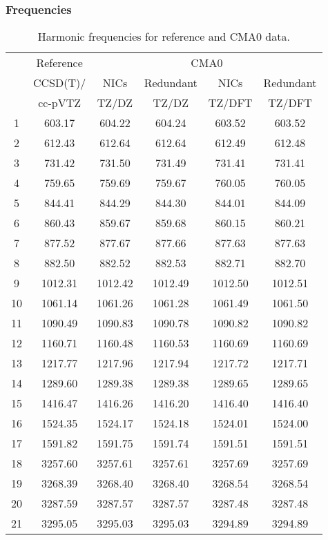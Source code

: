 \documentclass[10pt,oneside]{article}
\begin{document}
\begin{table}[h!]
\subsubsection*{Frequencies}
\centering
\caption{Harmonic frequencies for reference and CMA0 data.}
\begin{tabular}{cccccc}
\toprule
{} & Reference & \multicolumn{4}{c}{CMA0} \\
{} &  CCSD(T)/ &    NICs &  Redundant &    NICs & Redundant \\
{} &   cc-pVTZ &   TZ/DZ &      TZ/DZ &  TZ/DFT &    TZ/DFT \\
\midrule
1  &    603.17 &  604.22 &     604.24 &  603.52 &    603.52 \\
2  &    612.43 &  612.64 &     612.64 &  612.49 &    612.48 \\
3  &    731.42 &  731.50 &     731.49 &  731.41 &    731.41 \\
4  &    759.65 &  759.69 &     759.67 &  760.05 &    760.05 \\
5  &    844.41 &  844.29 &     844.30 &  844.01 &    844.09 \\
6  &    860.43 &  859.67 &     859.68 &  860.15 &    860.21 \\
7  &    877.52 &  877.67 &     877.66 &  877.63 &    877.63 \\
8  &    882.50 &  882.52 &     882.53 &  882.71 &    882.70 \\
9  &   1012.31 & 1012.42 &    1012.49 & 1012.50 &   1012.51 \\
10 &   1061.14 & 1061.26 &    1061.28 & 1061.49 &   1061.50 \\
11 &   1090.49 & 1090.83 &    1090.78 & 1090.82 &   1090.82 \\
12 &   1160.71 & 1160.48 &    1160.53 & 1160.69 &   1160.69 \\
13 &   1217.77 & 1217.96 &    1217.94 & 1217.72 &   1217.71 \\
14 &   1289.60 & 1289.38 &    1289.38 & 1289.65 &   1289.65 \\
15 &   1416.47 & 1416.26 &    1416.20 & 1416.40 &   1416.40 \\
16 &   1524.35 & 1524.17 &    1524.18 & 1524.01 &   1524.00 \\
17 &   1591.82 & 1591.75 &    1591.74 & 1591.51 &   1591.51 \\
18 &   3257.60 & 3257.61 &    3257.61 & 3257.69 &   3257.69 \\
19 &   3268.39 & 3268.40 &    3268.40 & 3268.54 &   3268.54 \\
20 &   3287.59 & 3287.57 &    3287.57 & 3287.48 &   3287.48 \\
21 &   3295.05 & 3295.03 &    3295.03 & 3294.89 &   3294.89 \\
\bottomrule
\end{tabular}
\end{table}
\end{document}

